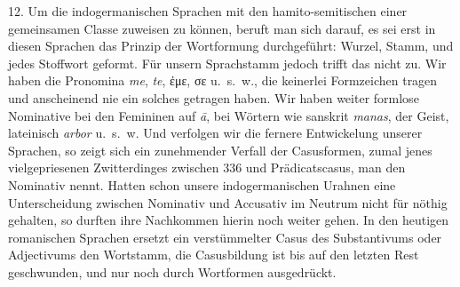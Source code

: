 \label{IV.III.II.4.12}12. Um die indogermanischen Sprachen mit den hamito-semitischen einer gemeinsamen  Classe zuweisen zu können, beruft man sich darauf, es sei erst in diesen Sprachen das Prinzip der Wortformung durchgeführt: Wurzel, Stamm,  und jedes Stoffwort geformt. Für unsern Sprachstamm jedoch trifft das nicht zu. Wir haben die Pronomina \textit{me}, \textit{te}, ἐμε, σε u.~s.~w., die keinerlei Formzeichen tragen und anscheinend nie ein solches getragen haben. Wir haben weiter formlose Nominative bei den Femininen auf \textit{ā}, bei Wörtern wie sanskrit \textit{manas}, der Geist, lateinisch \textit{arbor} u.~s.~w. Und verfolgen wir die fernere Entwickelung unserer Sprachen, so zeigt sich ein zunehmender Verfall der Casusformen, zumal jenes vielgepriesenen Zwitterdinges zwischen 336{\textbar}\label{fp.336} und Prädicatscasus,  man den Nominativ nennt. Hatten schon unsere indogermanischen Urahnen eine Unterscheidung zwischen Nominativ und Accusativ im Neutrum nicht für nöthig gehalten, so durften ihre Nachkommen hierin noch weiter gehen. In den heutigen romanischen Sprachen ersetzt ein verstümmelter Casus des Substantivums oder Adjectivums den Wortstamm, die Casusbildung ist bis auf den letzten Rest geschwunden, und nur noch  durch Wortformen ausgedrückt.

\label{fp.205}

